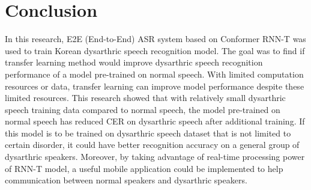 \documentclass[9pt,final,a4paper]{IEEEtran}
\begin{document}
\section{Conclusion}

In this research, E2E (End-to-End) ASR system based on Conformer RNN-T was used to train Korean dysarthric speech recognition model. 
The goal was to find if transfer learning method would improve dysarthric speech recognition performance of a model pre-trained on normal speech.
With limited computation resources or data, transfer learning can improve model performance despite these limited resources.
This research showed that with relatively small dysarthric speech training data compared to normal speech, the model pre-trained on normal speech has reduced CER on dysarthric speech after additional training.
If this model is to be trained on dysarthric speech dataset that is not limited to certain disorder, it could have better recognition accuracy on a general group of dysarthric speakers.
Moreover, by taking advantage of real-time processing power of RNN-T model, a useful mobile application could be implemented to help communication between normal speakers and dysarthric speakers.



\end{document}
